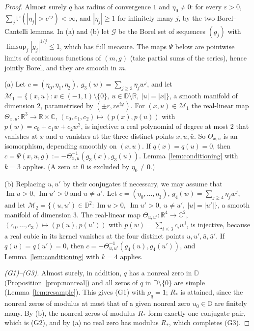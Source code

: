 \documentclass[11pt]{amsart}
\theoremstyle{definition}
\theoremstyle{remark}
\numberwithin{equation}{section}
\newcommand{\C}{\mathbb{C}}
\newcommand{\R}{\mathbb{R}}
\newcommand{\D}{\mathbb{D}}
\newcommand{\PP}{\mathbb{P}}
\newcommand{\eps}{\varepsilon}
\DeclareMathOperator{\im}{Im}
\begin{document}
\begin{proof}
Almost surely $q$ has radius of convergence $1$ and $\eta_0\ne0$: for every $\eps>0$, $\sum_j\PP(|\eta_j|>e^{\eps j})<\infty$, and $|\eta_j|\ge1$ for infinitely many $j$, by the two Borel--Cantelli lemmas. In (a) and (b) let $\mathcal G$ be the Borel set of sequences $(g_j)$ with $\limsup_j|g_j|^{1/j}\le1$, which has full measure. The maps $\Psi$ below are pointwise limits of continuous functions of $(m,g)$ (take partial sums of the series), hence jointly Borel, and they are smooth in $m$.

(a) Let $c=(\eta_0,\eta_1,\eta_2)$, $g_3(w)=\sum_{j\ge3}\eta_jw^j$, and let $\mathcal M_1=\{(x,u):x\in(-1,1)\setminus\{0\},\ u\in\D\setminus\R,\ |u|=|x|\}$, a smooth manifold of dimension $2$, parametrised by $(\pm r,re^{i\varphi})$. For $(x,u)\in\mathcal M_1$ the real-linear map $\Theta_{x,u}:\R^3\to\R\times\C$, $(c_0,c_1,c_2)\mapsto(p(x),p(u))$ with $p(w)=c_0+c_1w+c_2w^2$, is injective: a real polynomial of degree at most $2$ that vanishes at $x$ and $u$ vanishes at the three distinct points $x,u,\bar u$. So $\Theta_{x,u}$ is an isomorphism, depending smoothly on $(x,u)$. If $q(x)=q(u)=0$, then $c=\Psi(x,u,g):=-\Theta_{x,u}^{-1}(g_3(x),g_3(u))$. Lemma~\ref{lem:conditioning} with $k=3$ applies. (A zero at $0$ is excluded by $\eta_0\ne0$.)

(b) Replacing $u,u'$ by their conjugates if necessary, we may assume that $\im u>0$, $\im u'>0$ and $u\ne u'$. Let $c=(\eta_0,\dots,\eta_3)$, $g_4(w)=\sum_{j\ge4}\eta_jw^j$, and let $\mathcal M_2=\{(u,u')\in\D^2:\im u>0,\ \im u'>0,\ u\ne u',\ |u|=|u'|\}$, a smooth manifold of dimension $3$. The real-linear map $\Theta_{u,u'}:\R^4\to\C^2$, $(c_0,\dots,c_3)\mapsto(p(u),p(u'))$ with $p(w)=\sum_{i\le3}c_iw^i$, is injective, because a real cubic in its kernel vanishes at the four distinct points $u,u',\bar u,\bar u'$. If $q(u)=q(u')=0$, then $c=-\Theta_{u,u'}^{-1}(g_4(u),g_4(u'))$, and Lemma~\ref{lem:conditioning} with $k=4$ applies.

\emph{(G1)--(G3).} Almost surely, in addition, $q$ has a nonreal zero in $\D$ (Proposition~\ref{prop:nonreal}) and all zeros of $q$ in $\D\setminus\{0\}$ are simple (Lemma~\ref{lem:resample}). This gives (G1) with $\rho_q=1$; $R_*$ is attained, since the nonreal zeros of modulus at most that of a given nonreal zero $u_0\in\D$ are finitely many. By (b), the nonreal zeros of modulus $R_*$ form exactly one conjugate pair, which is (G2), and by (a) no real zero has modulus $R_*$, which completes (G3).
\end{proof}
\end{document}
